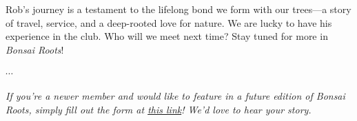 Rob’s journey is a testament to the lifelong bond we form with our trees---a story of travel, service, and a deep-rooted love for nature.
We are lucky to have his experience in the club.
Who will we meet next time?
Stay tuned for more in \emph{Bonsai Roots}!

\begin{center}
$\cdots$
\end{center}

\noindent
\emph{If you're a newer member and would like to feature in a future edition of Bonsai Roots, simply fill out the form at \href{https://forms.gle/quVXa4L8rhpnT5kr6}{this link}! We'd love to hear your story.}

\closearticle
\columnbreak
